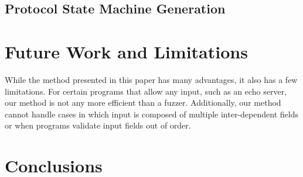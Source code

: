 \documentclass{acm_proc_article-sp}
\begin{document}
\subsection{Protocol State Machine Generation}


\section{Future Work and Limitations}

While the method presented in this paper has many advantages, it also has a few limitations.
For certain programs that allow any input, such as an echo server, our method is not any more efficient than a fuzzer.
Additionally, our method cannot handle cases in which input is composed of multiple inter-dependent fields or when programs validate input fields out of order.


\section{Conclusions}



\end{document}
